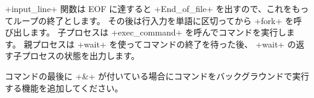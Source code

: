 \ml+input_line+ 関数は EOF に達すると \ml+End_of_file+ を出すので、これをもってループの終了とします。
その後は行入力を単語に区切ってから \ml+fork+ を呼び出します。
子プロセスは \ml+exec_command+ を呼んでコマンドを実行します。
親プロセスは \ml+wait+ を使ってコマンドの終了を待った後、
\ml+wait+ の返す子プロセスの状態を出力します。

\begin{exercise}
\label{shell}
コマンドの最後に \ml+&+ が付いている場合にコマンドをバックグラウンドで実行する機能を追加してください。
\end{exercise}
